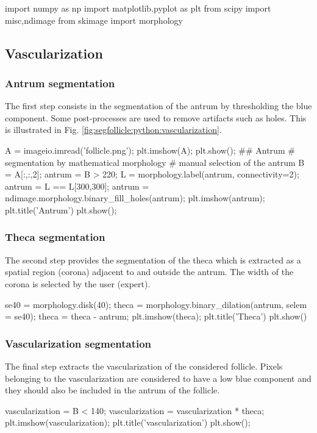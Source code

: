 \def\QRCODE{TB_image_TUT.IMG.image_segmentation_follicule_pythonqrcode.png}
\def\QRPAGE{http://www.iptutorials.science/tree/master/TB_image/TUT.IMG.image_segmentation_follicule/python}

\begin{python}
import numpy as np
import matplotlib.pyplot as plt
from scipy import misc,ndimage
from skimage import morphology
\end{python}

\vspace*{-.8\baselineskip}

\subsection{Vascularization}\vspace*{-3pt}
\subsubsection{Antrum segmentation}
The first step consists in the segmentation of the antrum by thresholding the blue component. Some post-processes are used to remove artifacts such as holes. This is illustrated in Fig. \ref{fig:segfollicle:python:vascularization}.


\begin{python}
A = imageio.imread('follicle.png');
plt.imshow(A);
plt.show();
## Antrum
# segmentation by mathematical morphology
# manual selection of the antrum
B = A[:,:,2];
antrum = B > 220;
L = morphology.label(antrum, connectivity=2);
antrum = L == L[300,300];
antrum = ndimage.morphology.binary_fill_holes(antrum);
plt.imshow(antrum);
plt.title('Antrum')
plt.show();
\end{python}

\subsubsection{Theca segmentation}
The second step provides the segmentation of the theca which is extracted as a spatial region (corona) adjacent to and outside the antrum. The width of the corona is selected by the user (expert).
\begin{python}
se40 = morphology.disk(40);
theca = morphology.binary_dilation(antrum, selem = se40);
theca = theca - antrum;
plt.imshow(theca); plt.title('Theca')
plt.show()
\end{python}

\subsubsection{Vascularization segmentation}
The final step extracts the vascularization of the considered follicle. Pixels belonging to the vascularization are considered to have a low blue component and they should also be included in the antrum of the follicle.
\begin{python}
vascularization = B < 140;
vascularization = vascularization * theca;
plt.imshow(vascularization);
plt.title('vascularization')
plt.show();
\end{python}

